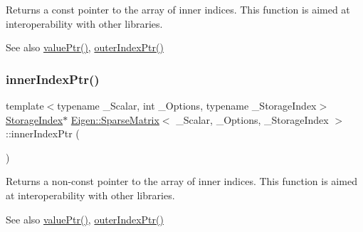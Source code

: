 \begin{DoxyReturn}{Returns}
a const pointer to the array of inner indices. This function is aimed at interoperability with other libraries. 
\end{DoxyReturn}
\begin{DoxySeeAlso}{See also}
\mbox{\hyperlink{class_eigen_1_1_sparse_matrix_ac2684952b14b5c9b0f68ae3bb8c517a6}{value\+Ptr()}}, \mbox{\hyperlink{class_eigen_1_1_sparse_matrix_a9451af2795c1a5b97678272475e41422}{outer\+Index\+Ptr()}} 
\end{DoxySeeAlso}
\mbox{\label{class_eigen_1_1_sparse_matrix_a8e9ef5d399d36fdd860ad05cb7a31455}} 
\subsubsection{\texorpdfstring{innerIndexPtr()}{innerIndexPtr()}\hspace{0.1cm}{\footnotesize\ttfamily [2/2]}}
{\footnotesize\ttfamily template$<$typename \+\_\+\+Scalar, int \+\_\+\+Options, typename \+\_\+\+Storage\+Index$>$ \\
\mbox{\hyperlink{class_eigen_1_1_sparse_matrix_base_a0b540ba724726ebe953f8c0df06081ed}{Storage\+Index}}$\ast$ \mbox{\hyperlink{class_eigen_1_1_sparse_matrix}{Eigen\+::\+Sparse\+Matrix}}$<$ \+\_\+\+Scalar, \+\_\+\+Options, \+\_\+\+Storage\+Index $>$\+::inner\+Index\+Ptr (\begin{DoxyParamCaption}{ }\end{DoxyParamCaption})\hspace{0.3cm}{\ttfamily [inline]}}

\begin{DoxyReturn}{Returns}
a non-\/const pointer to the array of inner indices. This function is aimed at interoperability with other libraries. 
\end{DoxyReturn}
\begin{DoxySeeAlso}{See also}
\mbox{\hyperlink{class_eigen_1_1_sparse_matrix_ac2684952b14b5c9b0f68ae3bb8c517a6}{value\+Ptr()}}, \mbox{\hyperlink{class_eigen_1_1_sparse_matrix_a9451af2795c1a5b97678272475e41422}{outer\+Index\+Ptr()}} 
\end{DoxySeeAlso}
\mbox{\label{class_eigen_1_1_sparse_matrix_a218204b051a24f579c394454786eeda0}} 

